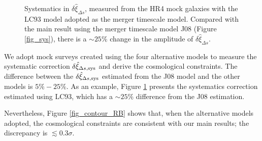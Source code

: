 \documentclass[iop]{emulateapj}
\begin{document}
\begin{figure}
   \caption{\label{fig_sys_LC93}
   Systematics in $\delta \hat \xi_{\Delta s}$, measured from the HR4 mock galaxies
   with the LC93 model adopted as the merger timescale model.
   Compared with the main result using the merger timescale model J08 (Figure \ref{fig_sys}), 
   there is a $\sim 25\%$ change in the amplitude of $\delta \hat \xi_{\Delta s}$.
   }
\end{figure}

We adopt mock surveys created using the four alternative models to
measure the systematic correction $\delta \hat\xi_{\Delta s, {\rm sys}}$
and derive the cosmological constraints.
The difference between the $\delta \hat\xi_{\Delta s, {\rm sys}}$ estimated from the J08 model and the other models is $5\%-25\%$.
As an example, Figure \ref{fig_sys_LC93} presents the systematics correction estimated using LC93,
which has a $\sim25\%$ difference from the J08 estimation.

Nevertheless, Figure \ref{fig_contour_RB} shows that, 
when the alternative models adopted, 
the cosmological constraints are consistent with our main results;
the discrepancy is $\lesssim0.3\sigma$.


\end{document}
